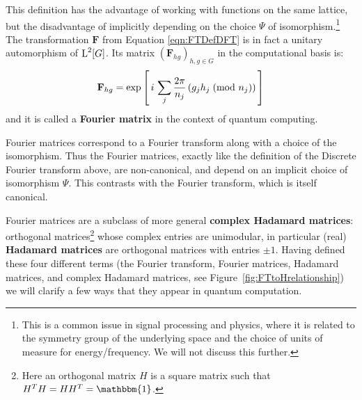 This definition has the advantage of working with functions on the same lattice, but the disadvantage of implicitly depending on the choice $\Psi$ of isomorphism.\footnote{This is a common issue in signal processing and physics, where it is related to the symmetry group of the underlying space and the choice of units of measure for energy/frequency. We will not discuss this further.} The transformation $\mathbf{F}$ from Equation \ref{eqn:FTDefDFT} is in fact a unitary automorphism of $\operatorname{L}^2[G]$. Its matrix $(\mathbf{F}_{hg})_{h,g \in G}$ in the computational basis is:
\begin{equation} \label{eqn:HadamardMatrixDef}
  \mathbf{F}_{hg} = \exp\left[\, i \, \sum_j \frac{2 \pi}{n_j} \left(\modclass{g_jh_j}{n_j}\right) \, \right] %
\end{equation}
and it is called a \textbf{Fourier matrix} in the context of quantum computing.

Fourier matrices correspond to a Fourier transform along with a choice of the isomorphism. Thus the Fourier matrices, exactly like the definition of the Discrete Fourier transform above, are non-canonical, and depend on an implicit choice of isomorphism $\Psi$. This contrasts with the Fourier transform, which is itself canonical.

Fourier matrices are a subclass of more general \textbf{complex Hadamard matrices}: orthogonal matrices\footnote{Here an orthogonal matrix $H$ is a square matrix such that $H^TH=HH^T=\mathbbm{1}$.} whose complex entries are unimodular, in particular (real) \textbf{Hadamard matrices} are orthogonal matrices with entries $\pm1$. Having defined these four different terms (the Fourier transform, Fourier matrices, Hadamard matrices, and complex Hadamard matrices, see Figure~\ref{fig:FTtoHrelationship}) we will clarify a few ways that they appear in quantum computation.

